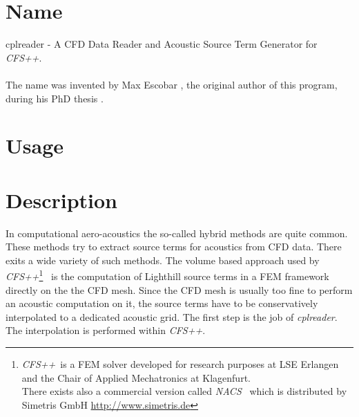 \documentclass[a4paper,10pt]{article}
\begin{document}






\newcommand{\figref}[1]{Fig.~\ref{fig:#1}}
\newcommand{\eqnref}[1]{Eq.~(\ref{eq:#1})}
\newcommand{\cfs}{\textit{CFS++}}
\newcommand{\nacs}{\textit{NACS}}
\newcommand{\cplreader}{\textit{cplreader}}
\newcommand{\hdf}{\textit{HDF5}}
\newcommand{\CFX}{\textit{ANSYS CFX}}
\newcommand{\OpenFOAM}{\textit{OpenFOAM}}
\newcommand{\FASTEST}{\textit{FASTEST-3D}}
\newcommand{\ANSYS}{\textit{ANSYS}}



\tableofcontents

\newpage
\section{Name}
cplreader  - A  CFD Data  Reader and  Acoustic Source  Term  Generator for
\cfs.\\\\ The  name was invented by  Max Escobar , the  original author of
this program, during his PhD thesis \cite{Escobar2007}.

\newpage
\section{Usage}

\newpage
\section{Description}
In  computational aero-acoustics  the so-called  hybrid methods  are quite
common.  These methods try to  extract source terms for acoustics from CFD
data.   There exits  a wide  variety of  such methods.   The  volume based
approach  used  by \cfs\footnote{\cfs\,  is  a  FEM  solver developed  for
  research purposes at LSE Erlangen  and the Chair of Applied Mechatronics
  at Klagenfurt.\\  There exists also  a commercial version  called \nacs~
  which  is distributed  by  Simetris GmbH  \url{http://www.simetris.de}}~
\cite{Kaltenbacher2005a} is the computation of Lighthill source terms in a
FEM framework directly on the the  CFD mesh. Since the CFD mesh is usually
too fine to  perform an acoustic computation on it,  the source terms have
to be conservatively interpolated to a dedicated acoustic grid.  The first
step is the job of \cplreader. The interpolation is performed within \cfs.
\end{document}
